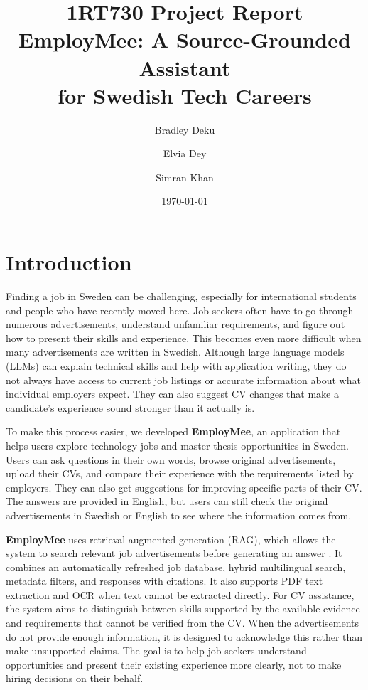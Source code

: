 \documentclass[a4paper,10pt]{article}
\title{\textbf{1RT730 Project Report}\\
EmployMee: A Source-Grounded Assistant\\for Swedish Tech Careers}
\author{Bradley Deku \and Elvia Dey \and Simran Khan}
\date{\today}
\begin{document}
	
\maketitle
    
 \section{Introduction}
 
Finding a job in Sweden can be challenging, especially for international students and people who have recently moved here. Job seekers often have to go through numerous advertisements, understand unfamiliar requirements, and figure out how to present their skills and experience. This becomes even more difficult when many advertisements are written in Swedish. Although large language models (LLMs) can explain technical skills and help with application writing, they do not always have access to current job listings or accurate information about what individual employers expect. They can also suggest CV changes that make a candidate’s experience sound stronger than it actually is.

To make this process easier, we developed \textbf{EmployMee}, an application that helps users explore technology jobs and master thesis opportunities in Sweden. Users can ask questions in their own words, browse original advertisements, upload their CVs, and compare their experience with the requirements listed by employers. They can also get suggestions for improving specific parts of their CV. The answers are provided in English, but users can still check the original advertisements in Swedish or English to see where the information comes from.

\textbf{EmployMee} uses retrieval-augmented generation (RAG), which allows the system to search relevant job advertisements before generating an answer \cite{rag}. It combines an automatically refreshed job database, hybrid multilingual search, metadata filters, and responses with citations. It also supports PDF text extraction and OCR when text cannot be extracted directly. For CV assistance, the system aims to distinguish between skills supported by the available evidence and requirements that cannot be verified from the CV. When the advertisements do not provide enough information, it is designed to acknowledge this rather than make unsupported claims. The goal is to help job seekers understand opportunities and present their existing experience more clearly, not to make hiring decisions on their behalf.
\end{document}
